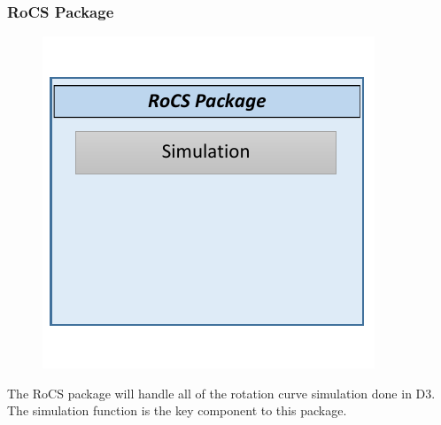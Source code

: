 \documentclass[titlepage]{article}
\begin{document}
\subsubsection{RoCS Package}
\begin{minipage}{\textwidth}
\begin{figure}
  \vspace{-20pt}
  \begin{center}
	\includegraphics{rocs_package.pdf}
  \end{center}
\end{figure}
The RoCS package will handle all of the rotation curve simulation done in D3. The simulation function is the key component to this package. 
\end{minipage}

\vspace{+100pt}
\end{document}
